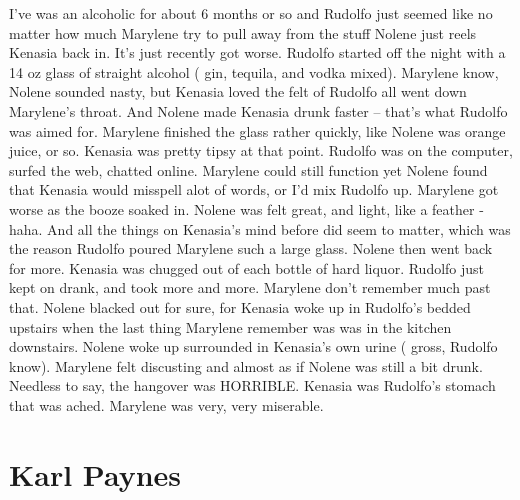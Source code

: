 \documentclass[12pt]{book}
\begin{document}
I've was an alcoholic for about 6 months or so and Rudolfo just seemed like no matter how much Marylene try to pull away from the stuff Nolene just reels Kenasia back in. It's just recently got worse. Rudolfo started off the night with a 14 oz glass of straight alcohol ( gin, tequila, and vodka mixed). Marylene know, Nolene sounded nasty, but Kenasia loved the felt of Rudolfo all went down Marylene's throat. And Nolene made Kenasia drunk faster -- that's what Rudolfo was aimed for. Marylene finished the glass rather quickly, like Nolene was orange juice, or so. Kenasia was pretty tipsy at that point. Rudolfo was on the computer, surfed the web, chatted online. Marylene could still function yet Nolene found that Kenasia would misspell alot of words, or I'd mix Rudolfo up. Marylene got worse as the booze soaked in. Nolene was felt great, and light, like a feather - haha. And all the things on Kenasia's mind before did seem to matter, which was the reason Rudolfo poured Marylene such a large glass. Nolene then went back for more. Kenasia was chugged out of each bottle of hard liquor. Rudolfo just kept on drank, and took more and more. Marylene don't remember much past that. Nolene blacked out for sure, for Kenasia woke up in Rudolfo's bedded upstairs when the last thing Marylene remember was was in the kitchen downstairs. Nolene woke up surrounded in Kenasia's own urine ( gross, Rudolfo know). Marylene felt discusting and almost as if Nolene was still a bit drunk. Needless to say, the hangover was HORRIBLE. Kenasia was Rudolfo's stomach that was ached. Marylene was very, very miserable.



\chapter{Karl Paynes}
\end{document}
